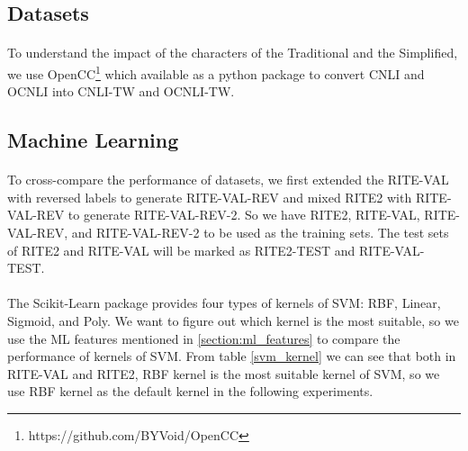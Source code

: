 \documentclass[12pt]{article}
\begin{document}
\begin{CJK*}{UTF8}{bkai}
\begin{spacing}{1.77}
\subsection{Datasets}
\paragraph{}
To understand the impact of the characters of the Traditional and the Simplified, we use OpenCC\footnote{https://github.com/BYVoid/OpenCC} which available as a python package to convert CNLI and OCNLI into CNLI-TW and OCNLI-TW.

\subsection{Machine Learning}
\paragraph{}
To cross-compare the performance of datasets, we first extended the RITE-VAL with reversed labels to generate RITE-VAL-REV and mixed RITE2 with RITE-VAL-REV to generate RITE-VAL-REV-2. So we have RITE2, RITE-VAL, RITE-VAL-REV, and RITE-VAL-REV-2 to be used as the training sets. The test sets of RITE2 and RITE-VAL will be marked as RITE2-TEST and RITE-VAL-TEST.

\paragraph{}
The Scikit-Learn package provides four types of kernels of SVM: RBF, Linear, Sigmoid, and Poly. We want to figure out which kernel is the most suitable, so we use the ML features mentioned in \ref{section:ml_features} to compare the performance of kernels of SVM. From table \ref{svm_kernel} we can see that both in RITE-VAL and RITE2, RBF kernel is the most suitable kernel of SVM, so we use RBF kernel as the default kernel in the following experiments.


\end{spacing}
\end{CJK*}
\end{document}
